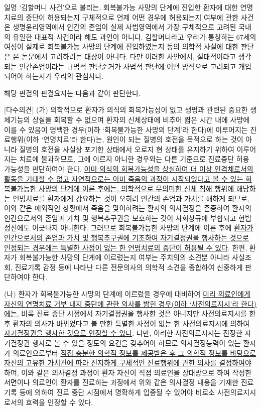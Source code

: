 일명 `김할머니 사건'으로 불리는, 회복불가능 사망의 단계에 진입한 환자에 대한 연명치료의 중단이 허용되는지 구체적으로 언제 어떤 경우에 허용되는지 여부에 관한 사건은 생명윤리영역에서 인간의 존엄이 실제 사법영역에서 가장 구체적으로 고려된 국내의 유일한 대표적 사건이라 해도 과언이 아니다. 김할머니라고 우리가 통칭하는 67세의 여성이 실제로 회복불가능 사망의 단계에 진입하였는지 등의 의학적 사실에 대한 판단은 본 논문에서 고려하려는 대상이 아니다. 다만 이러한 사안에서, 절대적이라고 생각되는 인간존엄이라는 규범적 판단준거가 사법적 판단에 어떤 방식으로 고려되고 개입되어야 하는지가 우리의 관심사다.

해당 판결의 판결요지는 다음과 같이 판단한다.

{[}다수의견{]} (가) 의학적으로 환자가 의식의 회복가능성이 없고 생명과 관련된 중요한 생체기능의 상실을 회복할 수 없으며 환자의 신체상태에 비추어 짧은 시간 내에 사망에 이를 수 있음이 명백한 경우(이하 `회복불가능한 사망의 단계'라 한다)에 이루어지는 진료행위(이하 `연명치료'라 한다)는, 원인이 되는 질병의 호전을 목적으로 하는 것이 아니라 질병의 호전을 사실상 포기한 상태에서 오로지 현 상태를 유지하기 위하여 이루어지는 치료에 불과하므로, 그에 이르지 아니한 경우와는 다른 기준으로 진료중단 허용 가능성을 판단하여야 한다. \ul{이미 의식의 회복가능성을 상실하여 더 이상 인격체로서의 활동을 기대할 수 없고 자연적으로는 이미 죽음의 과정이 시작되었다고 볼 수 있는 회복불가능한 사망의 단계에 이른 후에는, 의학적으로 무의미한 신체 침해 행위에 해당하는 연명치료를 환자에게 강요하는 것이 오히려 인간의 존엄과 가치를 해하게 되므로}, 이와 같은 예외적인 상황에서 죽음을 맞이하려는 환자의 의사결정을 존중하여 환자의 인간으로서의 존엄과 가치 및 행복추구권을 보호하는 것이 사회상규에 부합되고 헌법정신에도 어긋나지 아니한다. 그러므로 회복불가능한 사망의 단계에 이른 후에 \ul{환자가 인간으로서의 존엄과 가치 및 행복추구권에 기초하여 자기결정권을 행사하는 것으로 인정되는 경우에는 특별한 사정이 없는 한 연명치료의 중단이 허용될 수 있다}. 한편, 환자가 회복불가능한 사망의 단계에 이르렀는지 여부는 주치의의 소견뿐 아니라 사실조회, 진료기록 감정 등에 나타난 다른 전문의사의 의학적 소견을 종합하여 신중하게 판단하여야 한다.

(나) 환자가 회복불가능한 사망의 단계에 이르렀을 경우에 대비하여 \ul{미리 의료인에게 자신의 연명치료 거부 내지 중단에 관한 의사를 밝힌 경우(이하 `사전의료지시'라 한다)에는}, 비록 진료 중단 시점에서 자기결정권을 행사한 것은 아니지만 사전의료지시를 한 후 환자의 의사가 바뀌었다고 볼 만한 특별한 사정이 없는 한 사전의료지시에 의하여 \ul{자기결정권을 행사한 것으로 인정할 수 있다}. 다만, 이러한 사전의료지시는 진정한 자기결정권 행사로 볼 수 있을 정도의 요건을 갖추어야 하므로 의사결정능력이 있는 환자가 의료인으로부터 \ul{직접 충분한 의학적 정보를 제공받은 후 그 의학적 정보를 바탕으로 자신의 고유한 가치관에 따라 진지하게 구체적인 진료행위에 관한 의사를 결정하여야} 하며, 이와 같은 의사결정 과정이 환자 자신이 직접 의료인을 상대방으로 하여 작성한 서면이나 의료인이 환자를 진료하는 과정에서 위와 같은 의사결정 내용을 기재한 진료기록 등에 의하여 진료 중단 시점에서 명확하게 입증될 수 있어야 비로소 사전의료지시로서의 효력을 인정할 수 있다.

